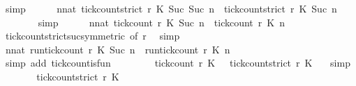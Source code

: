 \begin{isabellebody}
\ simp\isanewline
\ \ \ \ \isamarkupfalse%
\ {\isacartoucheopen}{\isasymforall}n{\isacharcolon}{\isacharcolon}nat{\isachardot}\ {\isacharparenleft}tick{\isacharunderscore}count{\isacharunderscore}strict\ r\ K\ {\isacharparenleft}Suc\ {\isacharparenleft}Suc\ n{\isacharparenright}{\isacharparenright}{\isacharparenright}\ {\isasymle}\ {\isacharparenleft}tick{\isacharunderscore}count{\isacharunderscore}strict\ r\ K\ {\isacharparenleft}Suc\ n{\isacharparenright}{\isacharparenright}{\isacartoucheclose}\isanewline
\ \ \ \ \ \ \isamarkupfalse%
\ simp\isanewline
\ \ \ \ \isamarkupfalse%
\ {\isacartoucheopen}{\isasymforall}n{\isacharcolon}{\isacharcolon}nat{\isachardot}\ {\isacharparenleft}tick{\isacharunderscore}count\ r\ K\ {\isacharparenleft}Suc\ n{\isacharparenright}{\isacharparenright}\ {\isasymle}\ {\isacharparenleft}tick{\isacharunderscore}count\ r\ K\ n{\isacharparenright}{\isacartoucheclose}\isanewline
\ \ \ \ \ \ \isamarkupfalse%
\ tick{\isacharunderscore}count{\isacharunderscore}strict{\isacharunderscore}suc{\isacharbrackleft}symmetric{\isacharcomma}\ of\ {\isacartoucheopen}r{\isacartoucheclose}{\isacharbrackright}\ \isamarkupfalse%
\ simp\isanewline
\ \ \ \ \isamarkupfalse%
\ {\isacharasterisk}{\isacharcolon}{\isacartoucheopen}{\isasymforall}n{\isacharcolon}{\isacharcolon}nat{\isachardot}\ {\isacharparenleft}run{\isacharunderscore}tick{\isacharunderscore}count\ r\ K\ {\isacharparenleft}Suc\ n{\isacharparenright}{\isacharparenright}\ {\isasymle}\ {\isacharparenleft}run{\isacharunderscore}tick{\isacharunderscore}count\ r\ K\ n{\isacharparenright}{\isacartoucheclose}\isanewline
\ \ \ \ \ \ \isamarkupfalse%
\ {\isacharparenleft}simp\ add{\isacharcolon}\ tick{\isacharunderscore}count{\isacharunderscore}is{\isacharunderscore}fun{\isacharparenright}\isanewline
\ \ \ \ \isamarkupfalse%
\ {}\ \isamarkupfalse%
\ {\isacartoucheopen}tick{\isacharunderscore}count\ r\ K\ {}\ {\isacharless}{\isacharequal}\ tick{\isacharunderscore}count{\isacharunderscore}strict\ r\ K\ {}{\isacartoucheclose}\ \isamarkupfalse%
\ simp\isanewline
\ \ \ \ \isamarkupfalse%
\ \isamarkupfalse%
\ {\isacartoucheopen}tick{\isacharunderscore}count{\isacharunderscore}strict\ r\ K\ {}\ {\isacharequal}\ {}{\isacartoucheclose}\ \isamarkupfalse%

\end{isabellebody}
